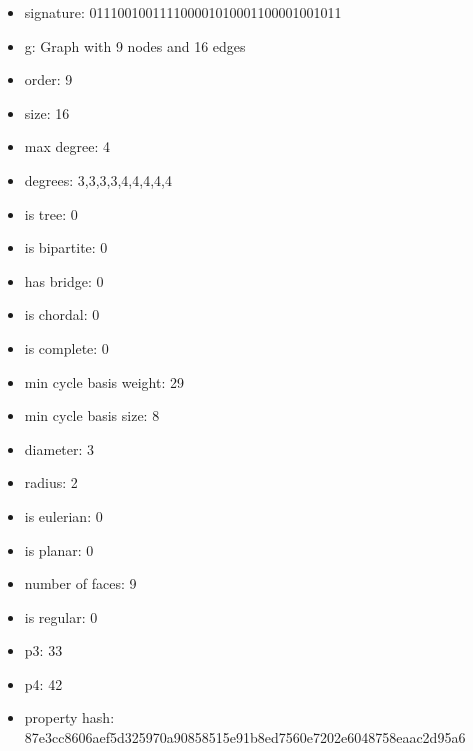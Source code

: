 \newpage
\begin{figure}
\end{figure}
\begin{itemize}
\item signature: 011100100111100001010001100001001011
\item g: Graph with 9 nodes and 16 edges
\item order: 9
\item size: 16
\item max degree: 4
\item degrees: 3,3,3,3,4,4,4,4,4
\item is tree: 0
\item is bipartite: 0
\item has bridge: 0
\item is chordal: 0
\item is complete: 0
\item min cycle basis weight: 29
\item min cycle basis size: 8
\item diameter: 3
\item radius: 2
\item is eulerian: 0
\item is planar: 0
\item number of faces: 9
\item is regular: 0
\item p3: 33
\item p4: 42
\item property hash: 87e3cc8606aef5d325970a90858515e91b8ed7560e7202e6048758eaac2d95a6
\end{itemize}
